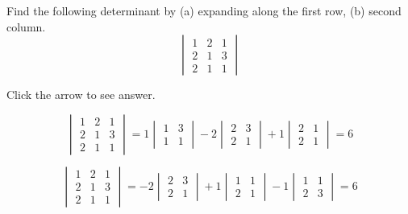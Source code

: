 \documentclass{ximera}
\begin{document}
\begin{problem}\label{prb:7.4} Find the following determinant by (a) expanding along the first row, (b)
second column.
$$\begin{vmatrix}
1 & 2 & 1 \\
2 & 1 & 3 \\
2 & 1 & 1
\end{vmatrix}$$

Click the arrow to see answer.
\begin{expandable}

$$\begin{vmatrix}
1 & 2 & 1 \\
2 & 1 & 3 \\
2 & 1 & 1
\end{vmatrix}=1\begin{vmatrix}1 & 3 \\1 & 1\end{vmatrix}-2\begin{vmatrix}2 & 3\\2 & 1\end{vmatrix}+1\begin{vmatrix}2 & 1\\2 & 1\end{vmatrix}=6$$

$$\begin{vmatrix}
1 & 2 & 1 \\
2 & 1 & 3 \\
2 & 1 & 1
\end{vmatrix}=-2\begin{vmatrix}2 & 3 \\2 & 1\end{vmatrix}+1\begin{vmatrix}1 & 1\\2 & 1\end{vmatrix}-1\begin{vmatrix}1 & 1\\2 & 3\end{vmatrix}=6$$

\end{expandable}
\end{problem}
\end{document}

